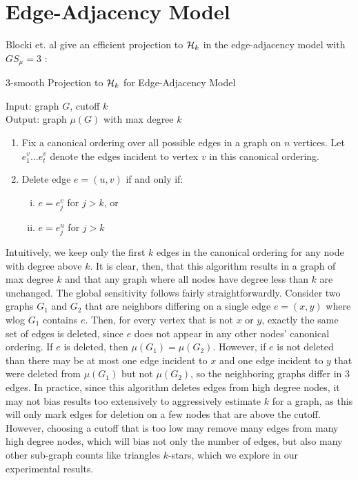 \section{Edge-Adjacency Model}

Blocki et. al give an efficient projection to $\mathcal{H}_k$ in the edge-adjacency model with $GS_\mu = 3$  \cite{BBDS13}:

\begin{algorithm}[!ht]
	\caption{3-smooth Projection to $\mathcal{H}_k$ for Edge-Adjacency Model}
	Input: graph $G$, cutoff $k$ \\
	Output: graph $\mu(G)$ with max degree $k$
	
	\vspace{0.1in}
	\begin{enumerate}
		\item  Fix a canonical ordering over all possible edges in a graph on $n$ vertices. Let $e_1^v...e_t^v$ denote the edges incident to vertex $v$ in this canonical ordering.
		\item Delete edge $e = (u,v)$ if and only if:
		\begin{enumerate}[(i)]
			\item $e = e_j^v$ for $j > k$, or
			\item $e = e_j^u$ for $j > k$
		\end{enumerate}
	\end{enumerate}
\end{algorithm}

Intuitively, we keep only the first $k$ edges in the canonical ordering for any node with degree above $k$. It is clear, then, that this algorithm results in a graph of max degree $k$ and that any graph where all nodes have degree less than $k$ are unchanged. The global sensitivity follows fairly straightforwardly. Consider two graphs $G_1$ and $G_2$ that are neighbors differing on a single edge $e=(x,y)$ where wlog $G_1$ contains $e$. Then, for every vertex that is not $x$ or $y$, exactly the same set of edges is deleted, since $e$ does not appear in any other nodes' canonical ordering. If $e$ is deleted, then $\mu(G_1) = \mu(G_2)$. However, if $e$ is not deleted than there may be at most one edge incident to $x$ and one edge incident to $y$ that were deleted from $\mu(G_1)$ but not $\mu(G_2)$, so the neighboring graphs differ in $3$ edges. In practice, since this algorithm deletes edges from high degree nodes, it may not bias results too extensively to aggressively estimate $k$ for a graph, as this will only mark edges for deletion on a few nodes that are above the cutoff. However, choosing a cutoff that is too low may remove many edges from many high degree nodes, which will bias not only the number of edges, but also many other sub-graph counts like triangles $k$-stars, which we explore in our experimental results.

